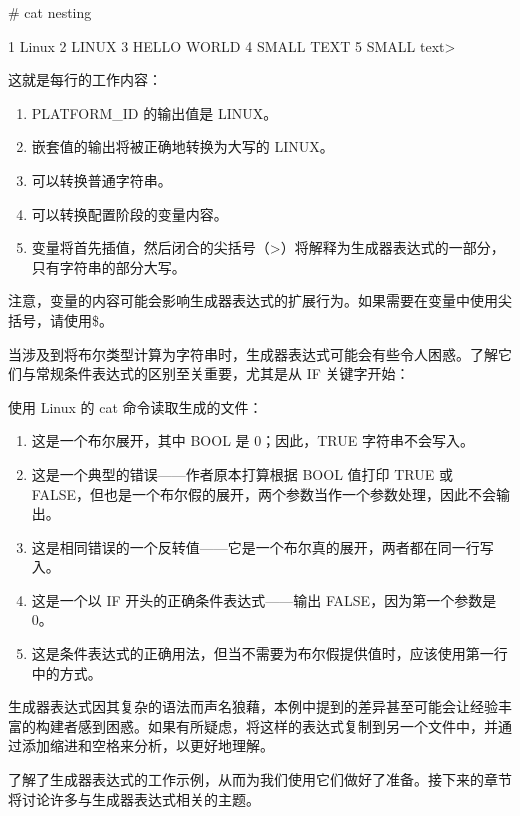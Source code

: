 \begin{shell}
# cat nesting

    1 Linux
    2 LINUX
    3 HELLO WORLD
    4 SMALL TEXT
    5 SMALL text>
\end{shell}

这就是每行的工作内容：

\begin{enumerate}
\item
PLATFORM\_ID 的输出值是 LINUX。

\item
嵌套值的输出将被正确地转换为大写的 LINUX。

\item
可以转换普通字符串。

\item
可以转换配置阶段的变量内容。

\item
变量将首先插值，然后闭合的尖括号（>）将解释为生成器表达式的一部分，只有字符串的部分大写。
\end{enumerate}

注意，变量的内容可能会影响生成器表达式的扩展行为。如果需要在变量中使用尖括号，请使用\$<ANGLE-R>。


当涉及到将布尔类型计算为字符串时，生成器表达式可能会有些令人困惑。了解它们与常规条件表达式的区别至关重要，尤其是从 IF 关键字开始：



使用 Linux 的 cat 命令读取生成的文件：

\begin{enumerate}
\item
这是一个布尔展开，其中 BOOL 是 0；因此，TRUE 字符串不会写入。

\item
这是一个典型的错误——作者原本打算根据 BOOL 值打印 TRUE 或 FALSE，但也是一个布尔假的展开，两个参数当作一个参数处理，因此不会输出。

\item
这是相同错误的一个反转值——它是一个布尔真的展开，两者都在同一行写入。

\item
这是一个以 IF 开头的正确条件表达式——输出 FALSE，因为第一个参数是 0。

\item
这是条件表达式的正确用法，但当不需要为布尔假提供值时，应该使用第一行中的方式。
\end{enumerate}

生成器表达式因其复杂的语法而声名狼藉，本例中提到的差异甚至可能会让经验丰富的构建者感到困惑。如果有所疑虑，将这样的表达式复制到另一个文件中，并通过添加缩进和空格来分析，以更好地理解。

了解了生成器表达式的工作示例，从而为我们使用它们做好了准备。接下来的章节将讨论许多与生成器表达式相关的主题。






